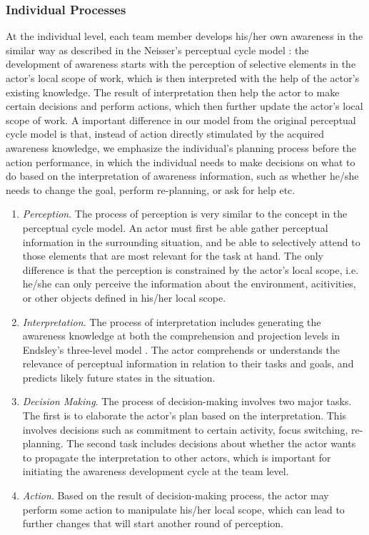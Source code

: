 \subsubsection{Individual Processes} %
\label{ssub:cognitive_processes}
At the individual level, each team member develops his/her own awareness in the similar way as described in the Neisser's perceptual cycle model \cite{neisser1976cognition}: the development of awareness starts with the perception of selective elements in the actor's local scope of work, which is then interpreted with the help of the actor's existing knowledge. The result of interpretation then help the actor to make certain decisions and perform actions, which then further update the actor's local scope of work. A important difference in our model from the original perceptual cycle model is that, instead of action directly stimulated by the acquired awareness knowledge, we emphasize the individual's planning process before the action performance, in which the individual needs to make decisions on what to do based on the interpretation of awareness information, such as whether he/she needs to change the goal, perform re-planning, or ask for help etc.

\begin{enumerate}
	\item \emph{Perception}. The process of perception is very similar to the concept in the perceptual cycle model. An actor must first be able gather perceptual information in the surrounding situation, and be able to selectively attend to those elements that are most relevant for the task at hand. The only difference is that the perception is constrained by the actor's local scope, i.e. he/she can only perceive the information about the environment, acitivities, or other objects defined in his/her local scope.
	\item \emph{Interpretation}. The process of interpretation includes generating the awareness knowledge at both the comprehension and projection levels in Endsley's three-level model \cite{Endsley1995}. The actor comprehends or understands the relevance of perceptual information in relation to their tasks and goals, and predicts likely future states in the situation.
	\item \emph{Decision Making}. The process of decision-making involves two major tasks. The first is to elaborate the actor's plan based on the interpretation. This involves decisions such as commitment to certain activity, focus switching, re-planning. The second task includes decisions about whether the actor wants to propagate the interpretation to other actors, which is important for initiating the awareness development cycle at the team level.
	\item \emph{Action}. Based on the result of decision-making process, the actor may perform some action to manipulate his/her local scope, which can lead to further changes that will start another round of perception.
\end{enumerate}

